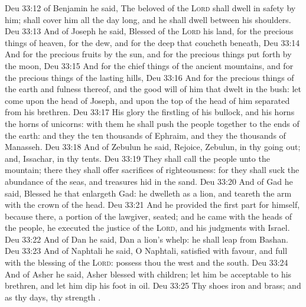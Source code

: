 \vs Deu 33:12  of Benjamin he said, The beloved of the \textsc{Lord} shall dwell in safety by him;  shall cover him all the day long, and he shall dwell between his shoulders.
\vs Deu 33:13 And of Joseph he said, Blessed of the \textsc{Lord}  his land, for the precious things of heaven, for the dew, and for the deep that coucheth beneath,
\vs Deu 33:14 And for the precious fruits  by the sun, and for the precious things put forth by the moon,
\vs Deu 33:15 And for the chief things of the ancient mountains, and for the precious things of the lasting hills,
\vs Deu 33:16 And for the precious things of the earth and fulness thereof, and  the good will of him that dwelt in the bush: let  come upon the head of Joseph, and upon the top of the head of him  separated from his brethren.
\vs Deu 33:17 His glory  the firstling of his bullock, and his horns  the horns of unicorns: with them he shall push the people together to the ends of the earth: and they  the ten thousands of Ephraim, and they  the thousands of Manasseh.
\vs Deu 33:18 And of Zebulun he said, Rejoice, Zebulun, in thy going out; and, Issachar, in thy tents.
\vs Deu 33:19 They shall call the people unto the mountain; there they shall offer sacrifices of righteousness: for they shall suck  the abundance of the seas, and  treasures hid in the sand.
\vs Deu 33:20 And of Gad he said, Blessed  he that enlargeth Gad: he dwelleth as a lion, and teareth the arm with the crown of the head.
\vs Deu 33:21 And he provided the first part for himself, because there,  a portion of the lawgiver,  seated; and he came with the heads of the people, he executed the justice of the \textsc{Lord}, and his judgments with Israel.
\vs Deu 33:22 And of Dan he said, Dan  a lion's whelp: he shall leap from Bashan.
\vs Deu 33:23 And of Naphtali he said, O Naphtali, satisfied with favour, and full with the blessing of the \textsc{Lord}: possess thou the west and the south.
\vs Deu 33:24 And of Asher he said,  Asher  blessed with children; let him be acceptable to his brethren, and let him dip his foot in oil.
\vs Deu 33:25 Thy shoes  iron and brass; and as thy days,  thy strength .
